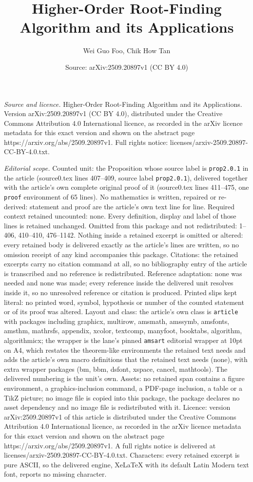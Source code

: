 \documentclass[10pt,a4paper]{amsart}
\title[Higher-Order Root-Finding Algorithm and its Applications]{Higher-Order Root-Finding Algorithm and its Applications}
\author{Wei Guo Foo, Chik How Tan}
\date{Source: arXiv:2509.20897v1 (CC BY 4.0)}
\begin{document}
\maketitle

\noindent\emph{Source and licence.} Higher-Order Root-Finding Algorithm and its Applications. Version arXiv:2509.20897v1 (CC BY 4.0), distributed under the Creative Commons Attribution 4.0 International licence, as recorded in the arXiv licence metadata for this exact version and shown on the abstract page https://arxiv.org/abs/2509.20897v1. Full rights notice: licenses/arxiv-2509.20897-CC-BY-4.0.txt.\par\smallskip

\noindent\textit{Editorial scope.} Counted unit: the Proposition whose source label is \texttt{prop2.0.1} in the article (source0.tex lines 407--409, source label \texttt{prop2.0.1}), delivered together with the article's own complete original proof of it (source0.tex lines 411--475, one \texttt{proof} environment of 65 lines). No mathematics is written, repaired or re-derived: statement and proof are the article's own text line for line. Required context retained uncounted: none. Every definition, display and label of those lines is retained unchanged. Omitted from this package and not redistributed: 1--406, 410--410, 476--1142. Nothing inside a retained excerpt is omitted or altered: every retained body is delivered exactly as the article's lines are written, so no omission receipt of any kind accompanies this package. Citations: the retained excerpts carry no citation command at all, so no bibliography entry of the article is transcribed and no reference is redistributed. Reference adaptation: none was needed and none was made; every reference inside the delivered unit resolves inside it, so no unresolved reference or citation is produced. Printed slips kept literal: no printed word, symbol, hypothesis or number of the counted statement or of its proof was altered. Layout and class: the article's own class is \texttt{article} with packages including graphicx, multirow, amsmath, amssymb, amsfonts, amsthm, mathrsfs, appendix, xcolor, textcomp, manyfoot, booktabs, algorithm, algorithmicx; the wrapper is the lane's pinned \texttt{amsart} editorial wrapper at 10pt on A4, which restates the theorem-like environments the retained text needs and adds the article's own macro definitions that the retained text needs (none), with extra wrapper packages (bm, bbm, dsfont, xspace, cancel, mathtools). The delivered numbering is the unit's own. Assets: no retained span contains a figure environment, a graphics-inclusion command, a PDF-page inclusion, a table or a TikZ picture; no image file is copied into this package, the package declares no asset dependency and no image file is redistributed with it. Licence: version arXiv:2509.20897v1 of this article is distributed under the Creative Commons Attribution 4.0 International licence, as recorded in the arXiv licence metadata for this exact version and shown on the abstract page https://arxiv.org/abs/2509.20897v1. A full rights notice is delivered at licenses/arxiv-2509.20897-CC-BY-4.0.txt. Characters: every retained excerpt is pure ASCII, so the delivered engine, XeLaTeX with its default Latin Modern text font, reports no missing character.
\end{document}
